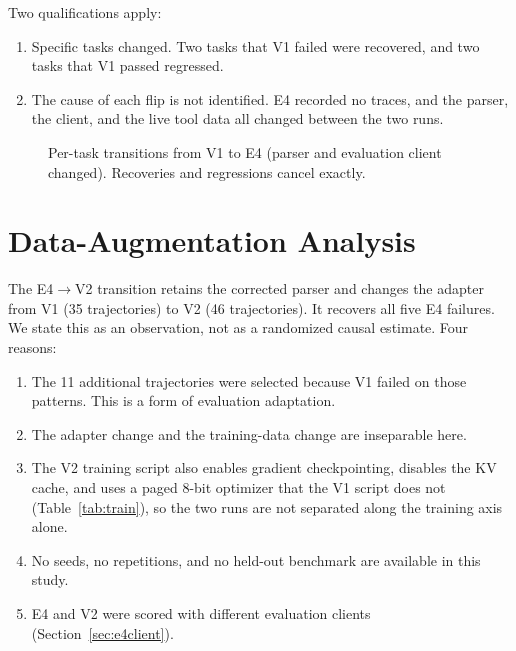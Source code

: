 \documentclass[10pt,twocolumn]{article}
\begin{document}
Two qualifications apply:
\begin{enumerate}\itemsep2pt
\item Specific tasks changed. Two tasks that V1 failed were recovered, and two tasks that V1 passed regressed.
\item The cause of each flip is not identified. E4 recorded no traces, and the parser, the client, and the live tool data all changed between the two runs.
\end{enumerate}

\begin{figure}[t]
\centering
{}
\caption{Per-task transitions from V1 to E4 (parser and evaluation client changed). Recoveries and regressions cancel exactly.}
\label{fig:parser}
\end{figure}

\section{Data-Augmentation Analysis}
\label{sec:data}

The E4$\to$V2 transition retains the corrected parser and changes the adapter from V1 (35 trajectories) to V2 (46 trajectories). It recovers all five E4 failures. We state this as an observation, not as a randomized causal estimate. Four reasons:
\begin{enumerate}\itemsep2pt
\item The 11 additional trajectories were selected because V1 failed on those patterns. This is a form of evaluation adaptation.
\item The adapter change and the training-data change are inseparable here.
\item The V2 training script also enables gradient checkpointing, disables the KV cache, and uses a paged 8-bit optimizer that the V1 script does not (Table~\ref{tab:train}), so the two runs are not separated along the training axis alone.
\item No seeds, no repetitions, and no held-out benchmark are available in this study.
\item E4 and V2 were scored with different evaluation clients (Section~\ref{sec:e4client}).
\end{enumerate}
\end{document}
